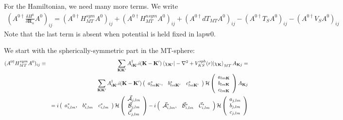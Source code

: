\documentclass[aps,prb,floatfix,epsfig,singlecolumn,showpacs,preprintnumbers]{revtex4}
\newcommand{\vR}{{\mathbf{R}}}
\newcommand{\vK}{{\mathbf{K}}}
\newcommand{\cH}{{\cal H}}
\renewcommand{\Im}{\textrm{Im}}
\newcommand{\vcA}{\vec{\cal A}}
\newcommand{\vcB}{\vec{\cal B}}
\newcommand{\vcC}{\vec{\cal C}}
\begin{document}
For the Hamiltonian, we need many more terms. We write
\begin{eqnarray}
(A^{0\dagger}\frac{\delta H^0}{\delta \vR_\alpha}  A^0)_{ij}=
(A^{0\dagger}H_{MT}^{sym}A^0)_{ij} + 
(A^{0\dagger}H_{MT}^{nsym}A^0)_{ij} + 
(A^{0\dagger}dT_{MT}A^0)_{ij} -
(A^{0\dagger} T_{S}A^0)_{ij} -
(A^{0\dagger} V_{S}A^0)_{ij}
\end{eqnarray}
Note that the last term is absent when potential is held fixed in lapw0.


We start with the spherically-symmetric part in the MT-sphere:
%
\begin{eqnarray}
(A^{0\dagger} H_{MT}^{sym} A^0)_{ij} &\equiv& \sum_{\vK\vK'} A^\dagger_{i \vK'}i(\vK-\vK')  \braket{\chi_{\vK'}|-\nabla^2+V_{KS}^{sph}(r)|\chi_\vK}_{MT}A_{\vK   j}=
\nonumber\\
&& \sum_{\vK\vK'} A^\dagger_{i \vK'}i(\vK-\vK') 
\left(
\begin{array}{ccc}
a_{lm\vK'}^*, & b_{lm\vK'}^* & c^*_{lm\vK'}
\end{array}
\right)
\cH
\left(
\begin{array}{c}
a_{lm\vK}\\
b_{lm\vK}\\ 
c_{lm\vK}
\end{array}
\right)  A_{\vK   j}
\nonumber\\
&& 
=i \left(
\begin{array}{ccc}
a_{i,lm}^*, & b_{i,lm}^* & c^*_{i,lm}
\end{array}
\right)
\cH
\left(
\begin{array}{c}
\vcA_{j,lm}\\
\vcB_{j,lm}\\ 
\vcC_{j,lm}
\end{array}
\right)-
i\left(
\begin{array}{ccc}
\vcA_{i,lm}^*, & \vcB_{i,lm}^* & \vcC^*_{i,lm}
\end{array}
\right)
\cH
\left(
\begin{array}{c}
a_{j,lm}\\
b_{j,lm}\\ 
c_{j,lm}
\end{array}
\right)
\end{eqnarray}
\end{document}

